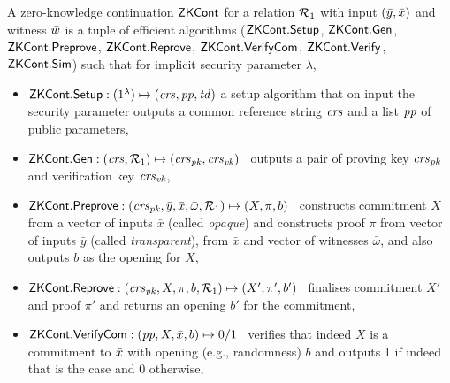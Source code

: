 
\begin{definition}[ZK Continuations]
\label{def:zk_cont}
 A zero-knowledge continuation ${\mathsf{ZKCont}}$ for a relation $\mathcal{R}_1$ with 
input $(\bar{y}, \bar{x})$ and witness $\bar{w}$ is a tuple of efficient algorithms 
(${\mathsf{ZKCont}}.{\mathsf{Setup}}$, ${\mathsf{ZKCont}}.\mathsf{Gen}$, ${\mathsf{ZKCont}}.{\mathsf{Preprove}}$, ${\mathsf{ZKCont}}.{\mathsf{Reprove}}$, ${\mathsf{ZKCont}}.{\mathsf{VerifyCom}}$, ${\mathsf{ZKCont}}.{\mathsf{Verify}}$, ${\mathsf{ZKCont}}.{\mathsf{Sim}}$) 
such that for implicit security parameter $\lambda$,
\begin{itemize}

\item ${\mathsf{ZKCont}}.{\mathsf{Setup}}: (1^{\lambda}) \mapsto (\mathit{crs}, \mathit{pp}, \mathit{td})$ a setup algorithm that on input the security parameter 
outputs a common reference string $\mathit{crs}$ and a list $\mathit{pp}$ of public parameters,

\item ${\mathsf{ZKCont}}.\mathsf{Gen}: (\mathit{crs}, \mathcal{R}_1) \mapsto (\mathit{crs}_{\mathit{pk}}, \mathit{crs}_{\mathit{vk}})$ \, 
outputs a pair of proving key $\mathit{crs}_{\mathit{pk}}$ and verification key $\mathit{crs}_{\mathit{vk}}$, 

\item ${\mathsf{ZKCont}}.{\mathsf{Preprove}}: (\mathit{crs}_{\mathit{pk}}, \bar{y}, \bar{x}, \bar{\omega}, \mathcal{R}_1) \mapsto (X, \pi, b)$ \,
constructs commitment $X$ from a vector of inputs $\bar{x}$ (called \emph{opaque}) and 
constructs proof $\pi$ from vector of inputs 
$\bar{y}$ (called \emph{transparent}), from $\bar{x}$ and vector of witnesses $\bar{\omega}$, and 
also outputs $b$ as the opening for $X$,

\item ${\mathsf{ZKCont}}.{\mathsf{Reprove}}: (\mathit{crs}_{\mathit{pk}}, X, \pi, b, \mathcal{R}_1) \mapsto (X', \pi', b')$ \,
finalises commitment $X'$ and proof $\pi'$ and returns an opening $b'$ for the commitment, 

\item ${\mathsf{ZKCont}}.{\mathsf{VerifyCom}}: (\mathit{pp}, X, \bar{x}, b) \mapsto 0/1$ \, 
verifies that indeed $X$ is a commitment to $\bar{x}$ with opening (e.g., randomness) $b$ and 
outputs 1 if indeed that is the case and 0 otherwise,
 

\end{itemize}
\end{definition}

